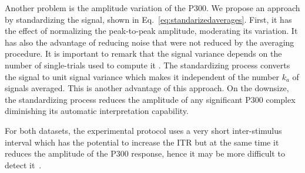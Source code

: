 \documentclass[entropy,article,submit,moreauthors,pdftex,10pt,a4paper]{mdpi}
\begin{document}




Another problem is the amplitude variation of the P300. We propose an approach by standardizing the signal, shown in Eq.~\ref{eq:standarizedaverages}.  First, it has the effect of normalizing the peak-to-peak amplitude, moderating its variation. It has also the advantage of reducing noise that were not reduced by the averaging procedure.   It is important to remark that the signal variance depends on the number of single-trials used to compute it \citep{van2006signal}.  The standardizing process converts the signal to unit signal variance which makes it independent of the number $k_a$ of signals averaged.   This is another advantage of this approach.  On the downsize, the standardizing process reduces the amplitude of any significant P300 complex diminishing its automatic interpretation capability.

For both datasets, the experimental protocol uses a very short inter-stimulus interval which has the potential to increase the ITR but at the same time it reduces the amplitude of the P300 response, hence it may be more difficult to detect it~\citep{Rao2013}.  



%
%
%
%
%
%
%
%
\end{document}
